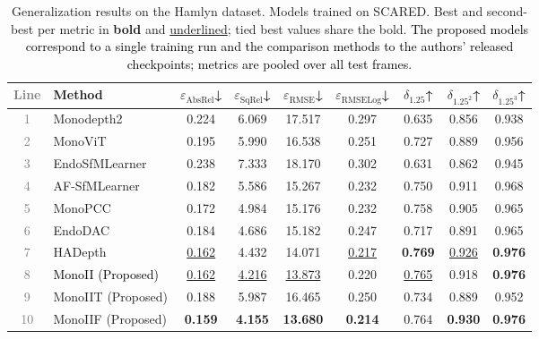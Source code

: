 \documentclass[a4paper,fleqn]{cas-dc}
\begin{document}
\begin{table}[!hbt]
\centering
\begin{tabular}{clccccccc}
\toprule
\textcolor{gray}{Line} & Method & $\varepsilon_\text{AbsRel}$↓ & 
        $\varepsilon_\text{SqRel}$↓ & 
        $\varepsilon_\text{RMSE}$↓ & 
        $\varepsilon_\text{RMSELog}$↓ & 
        $\delta_{1.25}$↑ & $\delta_{1.25^2}$↑ & 
        $\delta_{1.25^3}$↑ \\
\midrule
\textcolor{gray}{1} &Monodepth2     & 0.224 & 6.069 & 17.517 & 0.297 & 0.635 & 0.856 & 0.938 \\
\textcolor{gray}{2} &MonoViT        & 0.195 & 5.990 & 16.538 & 0.251 & 0.727 & 0.889 & 0.956 \\
\textcolor{gray}{3} &EndoSfMLearner & 0.238 & 7.333 & 18.170 & 0.302 & 0.631 & 0.862 & 0.945 \\
\textcolor{gray}{4} &AF-SfMLearner  & 0.182 & 5.586 & 15.267 & 0.232 & 0.750 & 0.911 & 0.968 \\
\textcolor{gray}{5} &MonoPCC        & 0.172 & 4.984 & 15.176 & 0.232 & 0.758 & 0.905 & 0.965 \\
\textcolor{gray}{6} &EndoDAC        & 0.184 & 4.686 & 15.182 & 0.247 & 0.717 & 0.891 & 0.965 \\
\textcolor{gray}{7} &HADepth        & \underline{0.162} & 4.432 & 14.071 & \underline{0.217} & \textbf{0.769} & \underline{0.926} & \textbf{0.976} \\
\midrule
\textcolor{gray}{8} & \textcolor{black}{MonoII (Proposed)} & \underline{0.162} & \underline{4.216} & \underline{13.873} & 0.220 & \underline{0.765} & 0.918 & \textbf{0.976} \\
\textcolor{gray}{9} &MonoIIT (Proposed) & 0.188 & 5.987 & 16.465 & 0.250 & 0.734 & 0.889 & 0.952 \\
\textcolor{gray}{10} &MonoIIF (Proposed) & \textbf{0.159} & \textbf{4.155} & \textbf{13.680} & \textbf{0.214} & 0.764 & \textbf{0.930} & \textbf{0.976} \\
\bottomrule
\end{tabular}
\caption{Generalization results on the Hamlyn dataset. 
Models trained on SCARED. Best and second-best 
per metric in \textbf{bold} and \underline{underlined}; tied best values share the bold. \textcolor{black}{The proposed models correspond to a single training run and the comparison methods to the authors' released checkpoints; metrics are pooled over all test frames.}}
\label{tab:quant_hamlyn}
\end{table}
\end{document}
